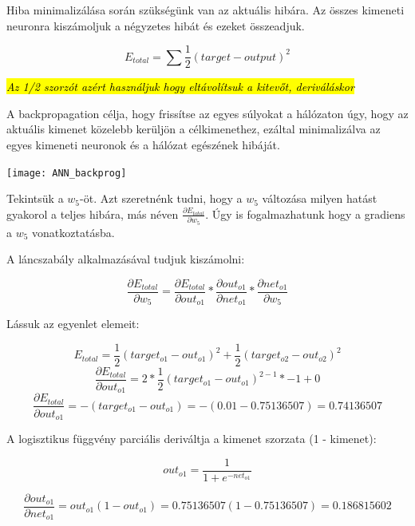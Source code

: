 Hiba minimalizálása során szükségünk van az aktuális hibára. Az összes kimeneti neuronra kiszámoljuk a négyzetes hibát és ezeket összeadjuk.

\[ E_{total} = \sum \dfrac{1}{2}(target - output)^2\]

\textit{\hl{Az 1/2 szorzót azért használjuk hogy eltávolítsuk a kitevőt, deriváláskor}
}

A backpropagation célja, hogy frissítse az egyes súlyokat a hálózaton úgy, hogy az aktuális kimenet közelebb kerüljön a célkimenethez, ezáltal minimalizálva az egyes kimeneti neuronok és a hálózat egészének hibáját.

\begin{center}
\texttt{[image: ANN\_backprog]}
\end{center}

Tekintsük a \(w_5\)-öt. Azt szeretnénk tudni, hogy a \(w_5\) változása milyen hatást gyakorol a teljes hibára, más néven $\frac{\partial E_ {total}}{\partial w_ {5}}$. Úgy is fogalmazhatunk hogy a gradiens a \(w_5\) vonatkoztatásba.

A láncszabály alkalmazásával tudjuk kiszámolni:

\[\frac{\partial E_{total}}{\partial w_{5}} = \frac{\partial E_{total}}{\partial out_{o1}} * \frac{\partial out_{o1}}{\partial net_{o1}} * \frac{\partial net_{o1}}{\partial w_{5}}\]

Lássuk az egyenlet elemeit:
\begin{flushleft}
\begin{equation}
E_{total} = \frac{1}{2}(target_{o1} - out_{o1})^{2} + \frac{1}{2}(target_{o2} - out_{o2})^{2}
\end{equation}
\begin{equation}
\frac{\partial E_{total}}{\partial out_{o1}} = 2 * \frac{1}{2}(target_{o1} - out_{o1})^{2 - 1} * -1 + 0
\end{equation}
\begin{equation}
\frac{\partial E_{total}}{\partial out_{o1}} = -(target_{o1} - out_{o1}) = -(0.01 - 0.75136507) = 0.74136507
\end{equation}

\end{flushleft}

A logisztikus függvény parciális deriváltja a kimenet szorzata (1 - kimenet):

\[out_{o1} = \frac{1}{1+e^{-net_{o1}}}\]

\[\frac{\partial out_{o1}}{\partial net_{o1}} = out_{o1}(1 - out_{o1}) = 0.75136507(1 - 0.75136507) = 0.186815602\]

